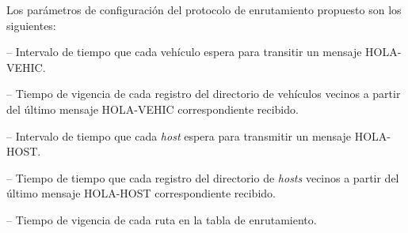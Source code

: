 Los parámetros de configuración del protocolo de enrutamiento propuesto son los
siguientes:

 -- Intervalo de tiempo que cada vehículo espera
para transitir un mensaje HOLA-VEHIC.

 -- Tiempo de vigencia de cada registro del
directorio de vehículos vecinos a partir del último mensaje HOLA-VEHIC
correspondiente recibido.

 -- Intervalo de tiempo que cada \textit{host}
espera para transmitir un mensaje HOLA-HOST.

 -- Tiempo de tiempo que cada registro del
directorio de \textit{hosts} vecinos a partir del último mensaje HOLA-HOST
correspondiente recibido.

 -- Tiempo de vigencia de cada ruta en la tabla de
enrutamiento.
